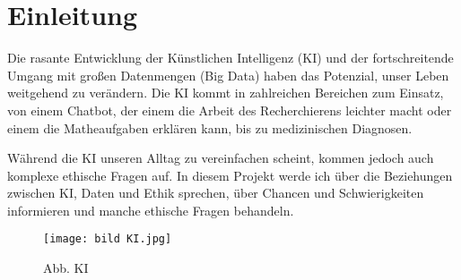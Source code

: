 \chapter{Einleitung}
\label{chap:einleitung}

Die rasante Entwicklung der Künstlichen Intelligenz (KI) und der fortschreitende Umgang mit großen Datenmengen (Big Data) haben das Potenzial, unser Leben weitgehend zu verändern. Die KI kommt in zahlreichen Bereichen zum Einsatz, von einem Chatbot, der einem die Arbeit des Recherchierens leichter macht oder einem die Matheaufgaben erklären kann, bis zu medizinischen Diagnosen. 

Während die KI unseren Alltag zu vereinfachen scheint, kommen jedoch auch komplexe ethische Fragen auf. In diesem Projekt werde ich über die Beziehungen zwischen KI, Daten und Ethik sprechen, über Chancen und Schwierigkeiten informieren und manche ethische Fragen behandeln.

\begin{figure}[h]
    \centering
    \texttt{[image: bild KI.jpg]}
    \caption{Abb. KI}
    \label{fig:ai}
\end{figure}